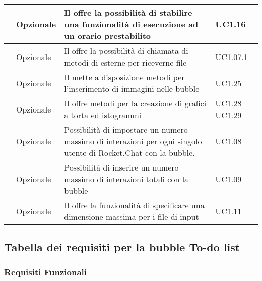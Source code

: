 \begin{longtable}{|P{1.5cm}|P{3cm}|P{6cm}|P{2.5cm}|}
	\hline \RequisitoOpF\label{L43} & Opzionale & Il  offre la possibilità di stabilire una funzionalità di  esecuzione ad un orario prestabilito & \hyperref[UC1.16]{UC1.16} \\
	\hline \RequisitoOpF\label{L44} & Opzionale & Il  offre la possibilità di chiamata di metodi di  esterne per riceverne file  & \hyperref[UC1.07.1]{UC1.07.1} \\
	\hline \RequisitoOpF\label{L45} & Opzionale & Il  mette a disposizione metodi per l’inserimento di immagini nelle bubble
	 & \hyperref[UC1.25]{UC1.25} \\
	\hline \RequisitoOpF\label{L46} & Opzionale & Il  offre metodi per la creazione di grafici a torta ed istogrammi
	 & \hyperref[UC1.28]{UC1.28} \linebreak \hyperref[UC1.29]{UC1.29}  \\	 
	 \hline \RequisitoOpF\label{L47} & Opzionale & Possibilità di impostare un numero massimo di interazioni per ogni singolo utente di Rocket.Chat con la bubble. & \hyperref[UC1.08]{UC1.08} \\
	 \hline \RequisitoOpF\label{L48} & Opzionale & Possibilità di inserire un numero massimo di interazioni totali con la bubble & \hyperref[UC1.09]{UC1.09} \\
	 \hline \RequisitoOpF\label{L49} & Opzionale & Il  offre la funzionalità di specificare una dimensione massima per i file di input & \hyperref[UC1.11]{UC1.11} \\
	\hline
\end{longtable}


\subsection{Tabella dei requisiti per la bubble To-do list}

\subsubsection{Requisiti Funzionali}

